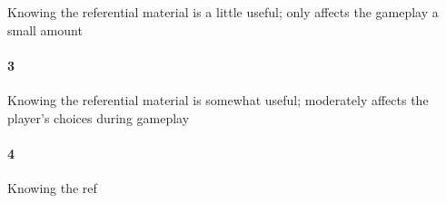 Knowing the referential material is a little useful; only affects the gameplay a small amount\paragraph{3}Knowing the referential material is somewhat useful; moderately affects the player's choices during gameplay\paragraph{4}Knowing the ref